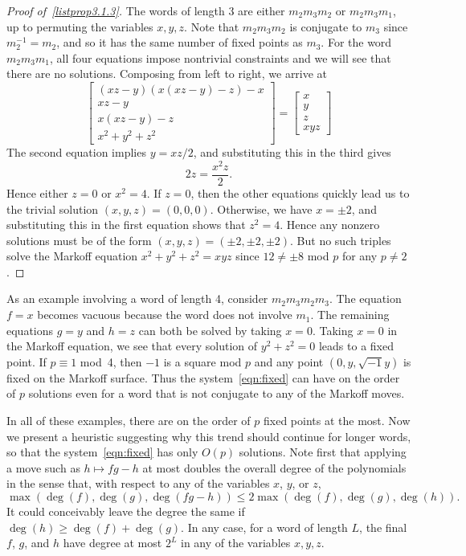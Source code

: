 \documentclass[AHL, Unicode, longabstracts, published]{cedram}
\begin{document}
\begin{proof}[{Proof of~\eqref{listprop3.1.3}}]
The words of length 3 are either $m_2m_3m_2$ or $m_2m_3m_1$, up to permuting the variables $x,y,z$. Note that $m_2m_3m_2$ is conjugate to $m_3$ since\linebreak$m_2^{-1}=m_2$, and so it has the same number of fixed points as $m_3$. For the word $m_2m_3m_1$, all four equations impose nontrivial constraints and we will see that there are no solutions. Composing from left to right, we arrive at
\[
\begin{bmatrix}
(xz-y)(x(xz-y)-z)-x \\
xz- y \\
x(xz-y) - z \\
x^2+y^2+z^2
\end{bmatrix} =
\begin{bmatrix}
x \\
y \\
z \\
xyz
\end{bmatrix}
\]
The second equation implies $y = xz/2$, and substituting this in the third gives
\[
2z = \frac{x^2z}{2}.
\]
Hence either $z=0$ or $x^2=4$. If $z=0$, then the other equations quickly lead us to the trivial solution $(x,y,z)=(0,0,0)$. Otherwise, we have $x = \pm 2$, and substituting this in the first equation shows that $z^2=4$. Hence any nonzero solutions must be of the form $(x,y,z) = (\pm 2, \pm 2, \pm 2)$. But no such triples solve the Markoff equation $x^2 + y^2 + z^2 = xyz$ since $12 \neq \pm 8$ mod $p$ for any $p \neq 2$.
\end{proof}

As an example involving a word of length 4, consider $m_2m_3m_2m_3$. The equation $f=x$ becomes vacuous because the word does not involve $m_1$. The remaining equations $g=y$ and $h=z$ can both be solved by taking $x=0$. Taking $x=0$ in the Markoff equation, we see that every solution of $y^2+z^2=0$ leads to a fixed point. If $p \equiv 1$ mod~4, then $-1$ is a square mod $p$ and any point $(0,y, \sqrt{-1}y)$ is fixed on the Markoff surface. Thus the system~\eqref{eqn:fixed} can have on the order of $p$ solutions even for a word that is not conjugate to any of the Markoff moves.

In all of these examples, there are on the order of $p$ fixed points at the most. Now we present a heuristic suggesting why this trend should continue for longer words, so that the system~\eqref{eqn:fixed} has only $O(p)$ solutions. Note first that applying a move such as $h \mapsto fg - h$ at most doubles the overall degree of the polynomials in the sense that, with respect to any of the variables $x$, $y$, or $z$,
\[
\max(\deg(f),\deg(g),\deg(fg-h)) \leq 2\max(\deg(f),\deg(g),\deg(h)).
\]
It could conceivably leave the degree the same if $\deg(h) \geq \deg(f)+\deg(g)$. In any case, for a word of length $L$, the final $f$, $g$, and $h$ have degree at most $2^L$ in any of the variables $x,y,z$.
\end{document}
